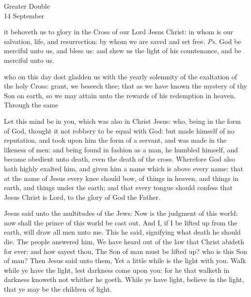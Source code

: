 \begin{inhead}
	{Greater Double\\
		14 September}
\end{inhead}

\properantiphonfix

\introit
{} it behoveth us to glory in the Cross of our Lord Jesus Christ: in whom is our salvation, life, and resurrection: by whom we are saved and set free. \textit{Ps.} God be merciful unto us, and bless us: and shew us the light of his countenance, and be merciful unto us.

\collect
{} who on this day dost gladden us with the yearly solemnity of the exaltation of the holy Cross: grant, we beseech thee; that as we have known the mystery of thy Son on earth, so we may attain unto the rewards of his redemption in heaven. Through the same

 Let this mind be in you, which was also in Christ Jesus: who, being in the form of God, thought it not robbery to be equal with God: but made himself of no reputation, and took upon him the form of a servant, and was made in the likeness of men: and being found in fashion as a man, he humbled himself, and became obedient unto death, even the death of the cross. Wherefore God also hath highly exalted him, and given him a name which is above every name:  that at the name of Jesus every knee should bow, of things in heaven, and things in earth, and things under the earth; and that every tongue should confess that Jesus Christ is Lord, to the glory of God the Father.



 Jesus said unto the multitudes of the Jews: Now is the judgment of this world: now shall the prince of this world be cast out. And I, if I be lifted up from the earth, will draw all men unto me. This he said, signifying what death he should die. The people answered him, We have heard out of the law that Christ abideth for ever: and how sayest thou, The Son of man must be lifted up? who is this Son of man? Then Jesus said unto them, Yet a little while is the light with you. Walk while ye have the light, lest darkness come upon you: for he that walketh in darkness knoweth not whither he goeth. While ye have light, believe in the light, that ye may be the children of light.

